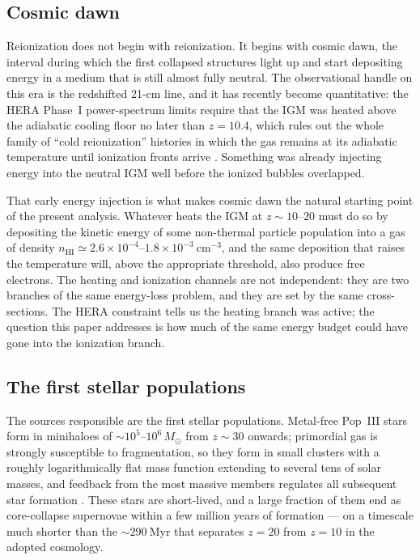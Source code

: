 \documentclass[twocolumn]{article}
\newcommand{\Msun}{M_{\odot}}
\begin{document}
\subsection{Cosmic dawn}

Reionization does not begin with reionization. It begins with cosmic dawn, the
interval during which the first collapsed structures light up and start
depositing energy in a medium that is still almost fully neutral. The
observational handle on this era is the redshifted 21-cm line, and it has
recently become quantitative: the HERA Phase~I power-spectrum limits require
that the IGM was heated above the adiabatic cooling floor no later than
$z = 10.4$, which rules out the whole family of ``cold reionization''
histories in which the gas remains at its adiabatic temperature until
ionization fronts arrive \citep{HERA2023}. Something was already injecting
energy into the neutral IGM well before the ionized bubbles overlapped.

That early energy injection is what makes cosmic dawn the natural starting
point of the present analysis. Whatever heats the IGM at $z \sim 10$--$20$ must
do so by depositing the kinetic energy of some non-thermal particle population
into a gas of density
$n_{\mathrm{HI}} \simeq 2.6\times10^{-4}$--$1.8\times10^{-3}\ \mathrm{cm^{-3}}$,
and the same deposition that raises the temperature will, above the appropriate
threshold, also produce free electrons. The heating and ionization channels are
not independent: they are two branches of the same energy-loss problem, and
they are set by the same cross-sections. The HERA constraint tells us the
heating branch was active; the question this paper addresses is how much of the
same energy budget could have gone into the ionization branch.

\subsection{The first stellar populations}

The sources responsible are the first stellar populations. Metal-free Pop~III
stars form in minihaloes of
$\sim\!10^{5}$--$10^{6}\,\Msun$ from $z \sim 30$ onwards; primordial gas is
strongly susceptible to fragmentation, so they form in small clusters with a
roughly logarithmically flat mass function extending to several tens of solar
masses, and feedback from the most massive members regulates all subsequent
star formation \citep{Klessen2023}. These stars are short-lived, and a large
fraction of them end as core-collapse supernovae within a few million years of
formation --- on a timescale much shorter than the $\sim\!290\ \mathrm{Myr}$
that separates $z = 20$ from $z = 10$ in the adopted cosmology.
\end{document}
